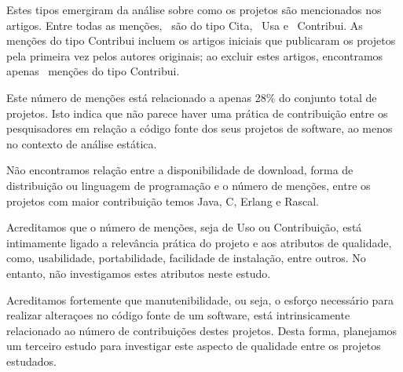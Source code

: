 Estes tipos emergiram da análise sobre como os projetos são mencionados nos
artigos. Entre todas as menções, \CiteCount \ são do tipo Cita, \UseCount \ Usa
e \ContributeCount \ Contribui. As menções do tipo Contribui incluem os artigos
iniciais que publicaram os projetos pela primeira vez pelos autores originais;
ao excluir estes artigos, encontramos apenas \ContributeStudyDoisCount \ menções
do tipo Contribui.

Este número de menções está relacionado a apenas 28\% do conjunto total de
projetos. Isto indica que não parece haver uma prática de contribuição entre os
pesquisadores em relação a código fonte dos seus projetos de software, ao menos
no contexto de análise estática.

Não encontramos relação entre a disponibilidade de download, forma de
distribuição ou linguagem de programação e o número de menções, entre os
projetos com maior contribuição temos Java, C, Erlang e Rascal.

Acreditamos que o número de menções, seja de Uso ou Contribuição, está
intimamente ligado a relevância prática do projeto e aos atributos de
qualidade, como, usabilidade, portabilidade, facilidade de instalação, entre
outros. No entanto, não investigamos estes atributos neste estudo.

Acreditamos fortemente que manutenibilidade, ou seja, o esforço necessário para
realizar alteraçoes no código fonte de um software, está intrinsicamente
relacionado ao número de contribuições destes projetos. Desta forma, planejamos
um terceiro estudo para investigar este aspecto de qualidade entre os projetos
estudados.

